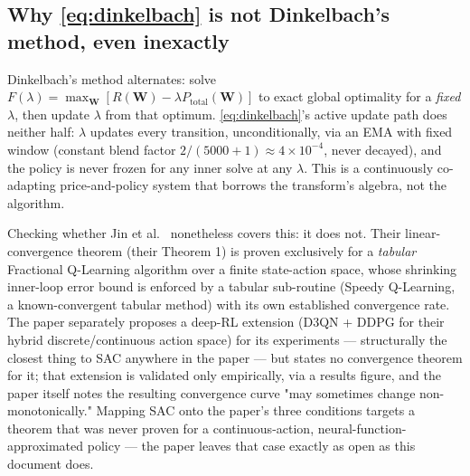 \documentclass[11pt]{article}
\begin{document}
\subsection{Why \eqref{eq:dinkelbach} is not Dinkelbach's method, even inexactly}

Dinkelbach's method alternates: solve
$F(\lambda)=\max_{\mathbf{W}}[R(\mathbf{W})-\lambda P_{\text{total}}(\mathbf{W})]$
to exact global optimality for a \emph{fixed} $\lambda$, then update
$\lambda$ from that optimum. \eqref{eq:dinkelbach}'s active update path does
neither half: $\lambda$ updates every transition, unconditionally, via an
EMA with fixed window (constant blend factor
$2/(5000+1)\approx 4\times 10^{-4}$, never decayed), and the policy is never
frozen for any inner solve at any $\lambda$. This is a continuously
co-adapting price-and-policy system that borrows the transform's algebra,
not the algorithm.

Checking whether Jin et al.\ \cite{JinTangZhangWang2023} nonetheless covers
this: it does not. Their linear-convergence theorem (their Theorem 1) is
proven exclusively for a \emph{tabular} Fractional Q-Learning algorithm over
a finite state-action space, whose shrinking inner-loop error bound is
enforced by a tabular sub-routine (Speedy Q-Learning, a known-convergent
tabular method) with its own established convergence rate. The paper
separately proposes a deep-RL extension (D3QN + DDPG for their hybrid
discrete/continuous action space) for its experiments --- structurally the
closest thing to SAC anywhere in the paper --- but states no convergence
theorem for it; that extension is validated only empirically, via a results
figure, and the paper itself notes the resulting convergence curve "may
sometimes change non-monotonically." Mapping SAC onto the paper's three
conditions targets a theorem that was never proven for a continuous-action,
neural-function-approximated policy --- the paper leaves that case exactly
as open as this document does.
\end{document}
